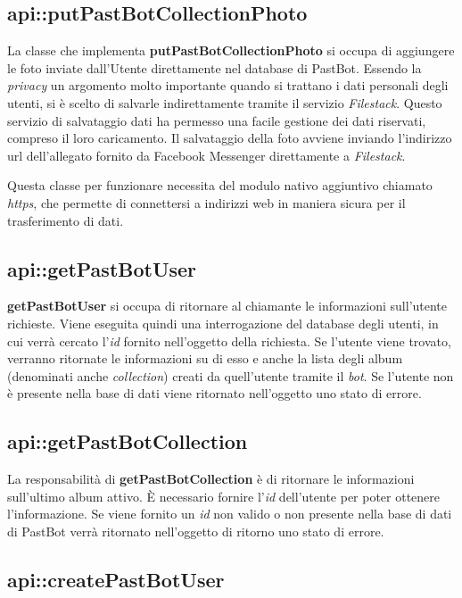 \subsection{api::putPastBotCollectionPhoto}

La classe che implementa \textbf{putPastBotCollectionPhoto} si occupa di
aggiungere le foto inviate dall'Utente direttamente nel database di PastBot.
Essendo la \textit{privacy} un argomento molto importante quando si trattano i
dati personali degli utenti, si è scelto di salvarle indirettamente tramite il
servizio \textit{Filestack}. Questo servizio di salvataggio dati ha permesso
una facile gestione dei dati riservati, compreso il loro caricamento. Il
salvataggio della foto avviene inviando l'indirizzo \gls{url} dell'allegato
fornito da Facebook Messenger direttamente a \textit{Filestack}.


Questa classe per funzionare necessita del modulo nativo aggiuntivo chiamato
\textit{https}, che permette di connettersi a indirizzi web in maniera sicura
per il trasferimento di dati.

\subsection{api::getPastBotUser}

\textbf{getPastBotUser} si occupa di ritornare al chiamante le informazioni
sull'utente richieste. Viene eseguita quindi una interrogazione del database
degli utenti, in cui verrà cercato l'\textit{id} fornito nell'oggetto della
richiesta. Se l'utente viene trovato, verranno ritornate le informazioni su di
esso e anche la lista degli album (denominati anche \textit{collection}) creati
da quell'utente tramite il \textit{bot}.
Se l'utente non è presente nella base di dati viene ritornato nell'oggetto uno
stato di errore.

\subsection{api::getPastBotCollection}

La responsabilità di \textbf{getPastBotCollection} è di ritornare le
informazioni sull'ultimo album attivo. È necessario fornire l'\textit{id}
dell'utente per poter ottenere l'informazione.
Se viene fornito un \textit{id} non valido o non presente nella base di dati di
PastBot verrà ritornato nell'oggetto di ritorno uno stato di errore.

\subsection{api::createPastBotUser}

